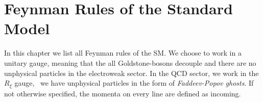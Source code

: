 

\chapter{Feynman Rules of the Standard Model}\label{app:1}

In this chapter we list all Feynman rules of the \acs{SM}. We choose to work in a unitary gauge, meaning that the all Goldstone-bosons decouple and there are no unphysical particles in the electroweak sector. In the QCD sector, we work in the $R_\xi$ gauge, \ie\ we have unphysical particles in the form of \textit{Faddeev-Popov ghosts}. If not otherwise specified, the momenta on every line are defined as incoming.

